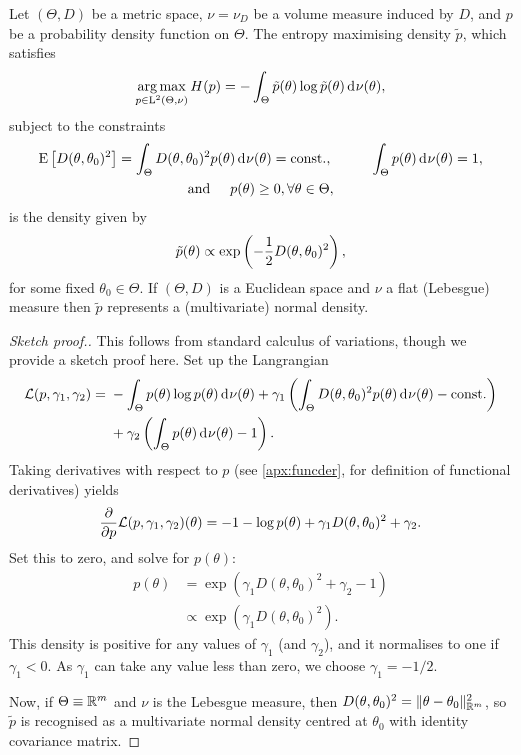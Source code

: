 \begin{lemma}\label{thm:maxentr}
  Let $(\Theta,D)$ be a metric space, $\nu=\nu_D$ be a volume measure induced by $D$, and $p$ be a probability density function on $\Theta$.
  The entropy maximising density $\tilde p$, which satisfies
  \[
    \operatorname*{arg\,max}_{p\in\text{L}^2(\Theta,\nu)} H(p) = - \int_\Theta \tilde p(\theta) \log \tilde p(\theta) \operatorname{d}\hspace{0.5pt}\!\nu(\theta),
  \]
  subject to the constraints
  \begin{align*}
    \begin{gathered}
      \operatorname{E}\big[D(\theta,\theta_0)^2\big] = \int_\Theta D(\theta,\theta_0)^2 p(\theta) \operatorname{d}\hspace{0.5pt}\! \nu(\theta) = \text{const.}\hspace{0.01em}, \hspace{1cm} 
      \int_\Theta p(\theta) \operatorname{d}\hspace{0.5pt}\! \nu(\theta) = 1, \\
      \text{and} \hspace{0.5cm} p(\theta) \geq 0, \forall \theta \in \Theta,
    \end{gathered}
  \end{align*}
  is the density given by
  \[
    \tilde p(\theta) \propto \exp \left(-\frac{1}{2} D(\theta,\theta_0)^2 \right),
  \]
  for some fixed $\theta_0\in\Theta$.
  If $(\Theta,D)$ is a Euclidean space and $\nu$ a flat (Lebesgue) measure then $\tilde p$ represents a (multivariate) normal density.
\end{lemma}

\begin{proof}[Sketch proof.]
  This follows from standard calculus of variations, though we provide a sketch proof here.
  Set up the Langrangian
  \begin{align*}
      {\mathcal L}(p,\gamma_1,\gamma_2) 
      ={}& 
      - \int_\Theta p(\theta) \log p(\theta) \operatorname{d}\hspace{0.5pt}\!\nu(\theta) +
      \gamma_1 \left(\int_\Theta D(\theta,\theta_0)^2 p(\theta) \operatorname{d}\hspace{0.5pt}\!\nu(\theta) - \text{const.}\hspace{0.01em} \right) \\
      &+ \gamma_2 \left( \int_\Theta p(\theta) \operatorname{d}\hspace{0.5pt}\!\nu(\theta) - 1 \right).
  \end{align*}
  Taking derivatives with respect to $p$ (see \cref{apx:funcder},  for definition of functional derivatives) yields
  \begin{align*}
    \frac{\partial}{\partial p} {\mathcal L}(p,\gamma_1,\gamma_2)(\theta)
    = - 1 - \log p(\theta) + \gamma_1 D(\theta,\theta_0)^2 + \gamma_2.
  \end{align*}
  Set this to zero, and solve for $p(\theta)$:
  \begin{align*}
    p(\theta) &= \exp \left( \gamma_1 D(\theta,\theta_0)^2 + \gamma_2 - 1 \right) \\
    &\propto \exp \left( \gamma_1 D(\theta,\theta_0)^2 \right).
  \end{align*}
  This density is positive for any values of $\gamma_1$ (and $\gamma_2$), and it normalises to one if $\gamma_1 < 0$. 
  As $\gamma_1$ can take any value less than zero, we choose $\gamma_1=-1/2$.
  
  Now, if $\Theta \equiv \mathbb{R}^m$ and $\nu$ is the Lebesgue measure, then $D(\theta,\theta_0)^2 = \lVert\theta-\theta_0\rVert_{\mathbb{R}^m}^2$, so $\tilde p$ is recognised as a multivariate normal density centred at $\theta_0$ with identity covariance matrix.
\end{proof}

